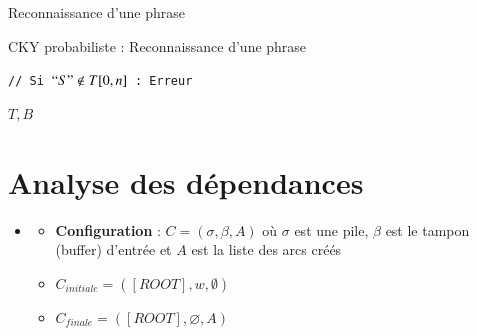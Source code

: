 \documentclass{KodeBook}
\begin{document}
Reconnaissance d'une phrase
\begin{block}{CKY probabiliste : Reconnaissance d'une phrase}
	\scriptsize\vspace{-3pt}
	\begin{algorithm}[H]
		
		
		
		\texttt{// Si $``S" \notin T[0, n] $ : Erreur}
		
		\Retour $T, B$ \;
		\vspace{-3pt}
	\end{algorithm}
\end{block}

\section{Analyse des dépendances}

\begin{minipage}{.6\textwidth}
	\begin{itemize}
		\item {} 
		\begin{itemize}
			\item \textbf{Configuration} :  $C = (\sigma, \beta, A)$ où $\sigma$ est une pile, $\beta$ est le tampon (buffer) d'entrée et $A$ est la liste des arcs créés
			\item $C_{initiale} = ([ROOT], w, \emptyset)$
			\item $C_{finale} = ([ROOT], \varnothing, A)$
		\end{itemize}
	\end{itemize}
\end{minipage}
\begin{minipage}{.38\textwidth}
\end{minipage}
\end{document}
